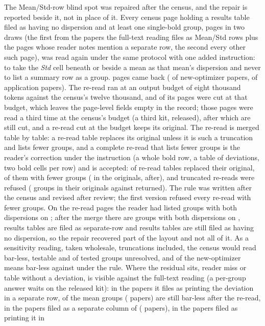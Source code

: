 \documentclass[preprint,review,12pt]{elsarticle}
\begin{document}
The Mean/Std-row blind spot was repaired after the census, and the repair is reported beside it, not in place of it. Every census page holding a results table filed as having no dispersion and at least one single-bold group, \nCrrrPagesInKits{} pages in two draws (the first from the papers the full-text reading files as Mean/Std rows plus the pages whose reader notes mention a separate row, the second every other such page), was read again under the same protocol with one added instruction: to take the \emph{Std} cell beneath or beside a mean as that mean's dispersion and never to list a summary row as a group. \nCrrrPagesReread{} pages came back (\nCrrrPagesNewOptimizer{} of new-optimizer papers, \nCrrrPagesApplication{} of application papers). The re-read ran at an output budget of eight thousand tokens against the census's twelve thousand, and \nCrrrPagesTruncatedFirstPass{} of its pages were cut at that budget, which leaves the page-level fields empty in the record; those pages were read a third time at the census's budget (a third kit, released), after which \nCrrrPagesTruncated{} are still cut, and a re-read cut at the budget keeps its original. The re-read is merged table by table: a re-read table replaces its original unless it is such a truncation and lists fewer groups, and a complete re-read that lists fewer groups is the reader's correction under the instruction (a whole bold row, a table of deviations, two bold cells per row) and is accepted: \nCrrrTablesReplaced{} of \nCrrrTablesReread{} re-read tables replaced their original, \nCrrrCorrectionsAccepted{} of them with fewer groups (\nCrrrCorrectionsGroupsOld{} in the originals, \nCrrrCorrectionsGroupsNew{} after), and \nCrrrTablesKept{} truncated re-reads were refused (\nCrrrKeptGroupsOld{} groups in their originals against \nCrrrKeptGroupsNew{} returned). The rule was written after the census and revised after review; the first version refused every re-read with fewer groups. On the re-read pages the reader had listed \nCrrrBeforeGroups{} groups with both dispersions on \nCrrrBeforeBarred{}; after the merge there are \nCrrrAfterGroups{} groups with both dispersions on \nCrrrAfterBarred{}, \nCrrrTablesSeparateRowAfter{} results tables are filed as separate-row and \nCrrrTablesNoneAfter{} results tables are still filed as having no dispersion, so the repair recovered part of the layout and not all of it. As a sensitivity reading, taken wholesale, truncations included, the census would read \nCrwAllNeither{} bar-less, \nCrwAllTestable{} testable and \nCrwAllFail{} of \nCrwAllTested{} tested groups unresolved, and \nCrwMeansNewOptimizerNeither{} \nCrwMeansNewOptimizerNeitherCi{} of the new-optimizer means bar-less against \nCrcMeansNewOptimizerNeither{} under the rule. Where the residual sits, reader miss or table without a deviation, is visible against the full-text reading (a per-group answer waits on the released kit): in the papers it files as printing the deviation in a separate row, \nCrcRlSeparateRowBarless{} of the \nCrcRlSeparateRowGroups{} mean groups (\nCrcRlSeparateRowPapers{} papers) are still bar-less after the re-read, in the papers filed as a separate column \nCrcRlSeparateColumnBarless{} of \nCrcRlSeparateColumnGroups{} (\nCrcRlSeparateColumnPapers{} papers), in the papers filed as printing it in 
\end{document}
